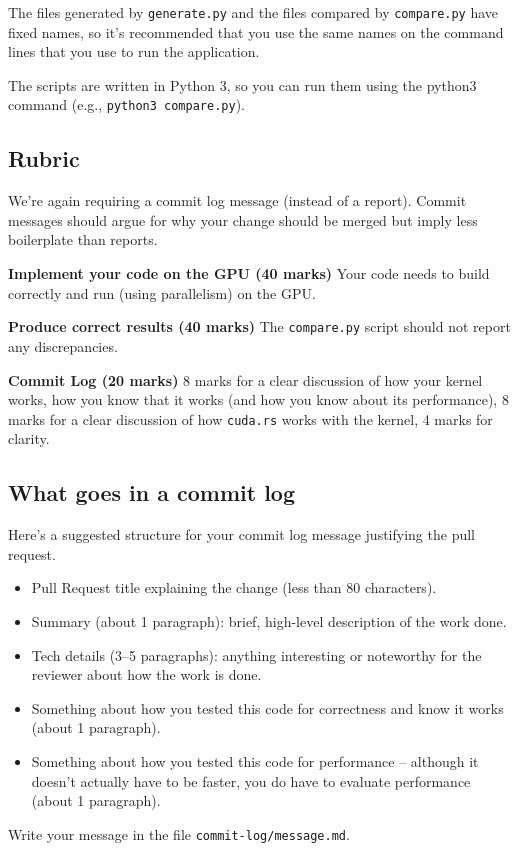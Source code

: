 The files generated by \texttt{generate.py} and the files compared by \texttt{compare.py} have fixed names, so it's recommended that you use the same names on the command lines that you use to run the application.

The scripts are written in Python 3, so you can run them using the python3 command (e.g., \texttt{python3 compare.py}).


\subsection*{Rubric }
We're again requiring a commit log message (instead of a report). Commit messages should argue for why your change should be merged but imply less boilerplate than reports.

\textbf{Implement your code on the GPU (40 marks) } Your code needs to build correctly and run (using parallelism) on the GPU.

\textbf{Produce correct results (40 marks)} The \texttt{compare.py} script should not report any discrepancies.

\textbf{Commit Log (20 marks)} 8 marks for a clear discussion of how your kernel works, how you know that it works (and how you know about its performance), 8 marks for a clear discussion of how \texttt{cuda.rs} works with the kernel, 4 marks for clarity.

\subsection*{What goes in a commit log}
Here's a suggested structure for your commit log message justifying the pull request.
\begin{itemize}
\item Pull Request title explaining the change (less than 80 characters).
\item Summary (about 1 paragraph): brief, high-level description of the work done.
\item Tech details (3--5 paragraphs): anything interesting or noteworthy for the reviewer about how the work is done. 
\item Something about how you tested this code for correctness and know it works (about 1 paragraph).
\item Something about how you tested this code for performance -- although it doesn't actually have to be faster, you do have to evaluate performance (about 1 paragraph).
\end{itemize}
Write your message in the file {\tt commit-log/message.md}.


